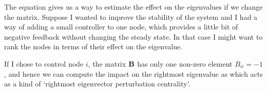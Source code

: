 \solution 
The equation gives us a way to estimate the effect on the eigenvalues if we change the matrix. Suppose I wanted to improve the stability of the system and I had a way of adding a small controller to one node, which provides a little bit of negative feedback without changing the steady state. In that case I might want to rank the nodes in terms of their effect on the eigenvalue. 

If I chose to control node $i$, the matrix $\bf B$ has only one non-zero element $B_{ii}=-1$, and hence we can compute the impact on the rightmost eigenvalue as 
which acts as a kind of `rightmost eigenvector perturbation centrality'.
